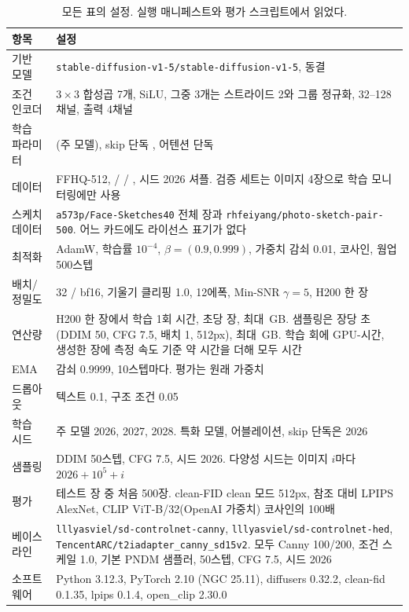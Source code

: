 \documentclass[10pt,twocolumn,a4paper]{article}
\begin{document}
\begin{table}[H]\centering\footnotesize
\setlength{\tabcolsep}{3pt}
\begin{tabular}{@{}lp{}@{}}
\toprule
항목 & 설정 \\
\midrule
기반 모델   & \texttt{stable-diffusion-v1-5/}\allowbreak\texttt{stable-diffusion-v1-5}, 동결 \\
조건 인코더 & $3{\times}3$ 합성곱 7개, SiLU, 그중 3개는 스트라이드 2와 그룹 정규화, 32--128채널, 출력 4채널 \\
학습 파라미터 & \ourParams{}(주 모델), skip 단독 \paramsSkipOnly{}, 어텐션 단독 \paramsAttnOnly{} \\
데이터      & FFHQ-512, \nTrain{} / \nValid{} / \nTest{}, 시드 2026 셔플. 검증 세트는 이미지 4장으로 학습 모니터링에만 사용 \\
스케치 데이터 & \texttt{a573p/}\allowbreak\texttt{Face-Sketches40} 전체 \sketchFaceN{}장과 \texttt{rhfeiyang/}\allowbreak\texttt{photo-sketch-pair-500}. 어느 카드에도 라이선스 표기가 없다 \\
최적화      & AdamW, 학습률 $10^{-4}$, $\beta{=}(0.9,0.999)$, 가중치 감쇠 0.01, 코사인, 웜업 500스텝 \\
배치/정밀도 & 32 / bf16, 기울기 클리핑 1.0, 12에폭, Min-SNR $\gamma{=}5$, H200 한 장 \\
연산량      & H200 한 장에서 학습 1회 \trainHoursMain{}시간, 초당 \trainImgSec{}장, 최대 \trainPeakGb{}\,GB. 샘플링은 장당 \sampleSecImg{}초(DDIM 50, CFG 7.5, 배치 1, 512px), 최대 \samplePeakGb{}\,GB. 학습 \nTrainRuns{}회에 \trainHoursAll{} GPU-시간, 생성한 \sampleImages{}장에 측정 속도 기준 약 \sampleHoursAll{}시간을 더해 모두 \gpuHoursAll{}시간 \\
EMA         & 감쇠 0.9999, 10스텝마다. 평가는 원래 가중치 \\
드롭아웃    & 텍스트 0.1, 구조 조건 0.05 \\
학습 시드   & 주 모델 2026, 2027, 2028. 특화 모델, 어블레이션, skip 단독은 2026 \\
샘플링      & DDIM 50스텝, CFG 7.5, 시드 2026. 다양성 시드는 이미지 $i$마다 $2026{+}10^5{+}i$ \\
평가        & 테스트 \nTest{}장 중 처음 500장. clean-FID clean 모드 512px, 참조 대비 LPIPS AlexNet, CLIP ViT-B/32(OpenAI 가중치) 코사인의 100배 \\
베이스라인  & \texttt{lllyasviel/}\allowbreak\texttt{sd-controlnet-canny}, \texttt{lllyasviel/}\allowbreak\texttt{sd-controlnet-hed}, \texttt{TencentARC/}\allowbreak\texttt{t2iadapter\_}\allowbreak\texttt{canny\_sd15v2}. 모두 Canny 100/200, 조건 스케일 1.0, 기본 PNDM 샘플러, 50스텝, CFG 7.5, 시드 2026 \\
소프트웨어  & Python 3.12.3, PyTorch 2.10 (NGC 25.11), diffusers 0.32.2, clean-fid 0.1.35, lpips 0.1.4, open\_clip 2.30.0 \\
\bottomrule
\end{tabular}
\caption{모든 표의 설정. 실행 매니페스트와 평가 스크립트에서 읽었다.}
\label{tab:repro}
\end{table}



\end{document}
